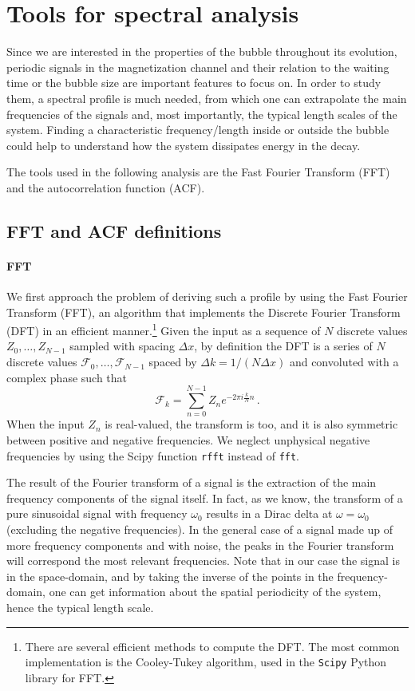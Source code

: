 \section{Tools for spectral analysis}
Since we are interested in the properties of the bubble throughout its evolution, periodic signals in the magnetization channel and their relation to the waiting time or the bubble size are important features to focus on. In order to study them, a spectral profile is much needed, from which one can extrapolate the main frequencies of the signals and, most importantly, the typical length scales of the system.
Finding a characteristic frequency/length inside or outside the bubble could help to understand how the system dissipates energy in the decay.

The tools used in the following analysis are the Fast Fourier Transform (FFT) and the autocorrelation function (ACF).

\subsection{FFT and ACF definitions}
\paragraph{FFT}
We first approach the problem of deriving such a profile by using the Fast Fourier Transform (FFT), an algorithm that implements the Discrete Fourier Transform (DFT) in an efficient manner.\footnote{There are several efficient methods to compute the DFT. The most common implementation is the Cooley-Tukey algorithm, used in the \texttt{Scipy} Python library for FFT.} Given the input as a sequence of $N$ discrete values $Z_0,\dots,Z_{N-1}$ sampled with spacing $\Delta x$, by definition the DFT is a series of $N$ discrete values $\mathcal{F}_0,\dots,\mathcal{F}_{N-1}$ spaced by $\Delta k = 1/(N\Delta x)$ and convoluted with a complex phase such that
\begin{equation*}
    \mathcal{F}_k = \sum_{n=0}^{N-1} Z_n e^{-2\pi i \frac{k}{N}n}\, .
\end{equation*}
When the input $Z_n$ is real-valued, the transform is too, and it is also symmetric between positive and negative frequencies. We neglect unphysical negative frequencies by using the Scipy function \texttt{rfft} instead of \texttt{fft}.

The result of the Fourier transform of a signal is the extraction of the main frequency components of the signal itself. In fact, as we know, the transform of a pure sinusoidal signal with frequency $\omega_0$ results in a Dirac delta at $\omega = \omega_0$ (excluding the negative frequencies). In the general case of a signal made up of more frequency components and with noise, the peaks in the Fourier transform will correspond the most relevant frequencies. Note that in our case the signal is in the space-domain, and by taking the inverse of the points in the frequency-domain, one can get information about the spatial periodicity of the system, hence the typical length scale.

